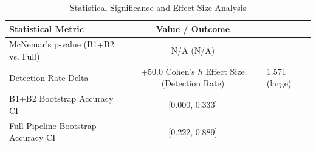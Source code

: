 \begin{table}[h]
\centering
\caption{Statistical Significance and Effect Size Analysis}
\label{tab:semantic_stats}
\begin{tabular}{lc}
\hline
\textbf{Statistical Metric} & \textbf{Value / Outcome} \\ \hline
McNemar's p-value (B1+B2 vs. Full) & N/A (N/A) \\
Detection Rate Delta & +50.0%
Cohen's $h$ Effect Size (Detection Rate) & 1.571 (large) \\
B1+B2 Bootstrap Accuracy CI & [0.000, 0.333] \\
Full Pipeline Bootstrap Accuracy CI & [0.222, 0.889] \\
\hline
\end{tabular}
\end{table}
